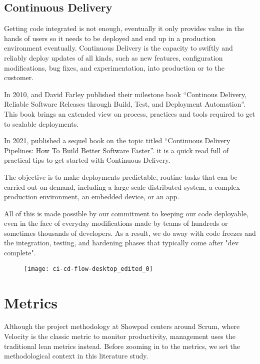\subsection{Continuous Delivery}
Getting code integrated is not enough, eventually it only provides value in the hands of users so it needs to be deployed and end up in a production environment eventually. Continuous Delivery is the capacity to swiftly and reliably deploy updates of all kinds, such as new features, configuration modifications, bug fixes, and experimentation, into production or to the customer.

In 2010,  and David Farley published their milestone book ``Continous Delivery, Reliable Software Releases through Build, Test, and Deployment Automation''. This book brings an extended view on process, practices and tools required to get to scalable deployments.

In 2021,  published a sequel book on the topic titled ``Continuous Delivery Pipelines: How To Build Better Software Faster''. it is a quick read full of practical tips to get started with Continuous Delivery.

The objective is to make deployments predictable, routine tasks that can be carried out on demand, including a large-scale distributed system, a complex production environment, an embedded device, or an app.

All of this is made possible by our commitment to keeping our code deployable, even in the face of everyday modifications made by teams of hundreds or sometimes thousands of developers. As a result, we do away with code freezes and the integration, testing, and hardening phases that typically come after "dev complete".

\begin{figure}[!h]
    \texttt{[image: ci-cd-flow-desktop\_edited\_0]}
    \centering
\end{figure}
\section{Metrics}
\label{sec:metrics}
Although the project methodology at Showpad centers around \gls{Scrum}, where Velocity is the classic metric to monitor productivity, management uses the traditional lean metrics instead. Before zooming in to the metrics, we set the methodological context in this literature study.
